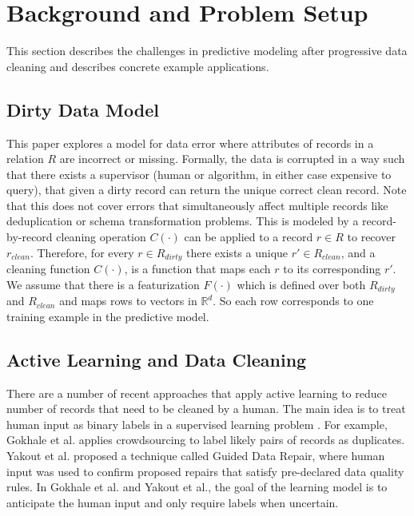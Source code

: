 \section{Background and Problem Setup}\label{background}
This section describes the challenges in predictive modeling after progressive data 
cleaning and describes concrete example applications.

\subsection{Dirty Data Model}\label{dmodel}
This paper explores a model for data error where attributes of records in a relation $R$ are incorrect or missing.
Formally, the data is corrupted in a way such that there exists a supervisor (human or algorithm, in either case expensive to query), that given a dirty record can return the unique correct clean record.
Note that this does not cover errors that simultaneously affect multiple records like deduplication or schema transformation problems.
This is modeled by a record-by-record cleaning operation $C(\cdot)$ can be applied to a record $r \in R$ to recover $r_{clean}$.
Therefore, for every $r \in R_{dirty}$ there exists a unique $r' \in R_{clean}$, and a cleaning function $C(\cdot)$, is a function that maps each $r$ to its corresponding $r'$.
We assume that there is a featurization $F(\cdot)$ which is defined over both $R_{dirty}$ and $R_{clean}$ and maps rows to vectors in $\mathbb{R}^d$.
So each row corresponds to one training example in the predictive model.

\subsection{Active Learning and Data Cleaning}\label{alrw}
There are a number of recent approaches that apply active learning to reduce number of records that need to be cleaned by a human.
The main idea is to treat human input as binary labels in a supervised learning problem \cite{DBLP:journals/pvldb/MozafariSFJM14}.
For example, Gokhale et al. \cite{gokhale2014corleone} applies crowdsourcing to label likely pairs of records as duplicates.
Yakout et al. \cite{DBLP:journals/pvldb/YakoutENOI11} proposed a technique called Guided Data Repair, where human input was used to confirm proposed repairs that satisfy pre-declared data quality rules.
In Gokhale et al. and Yakout et al., the goal of the learning model is to anticipate the human input and only require labels when uncertain.

